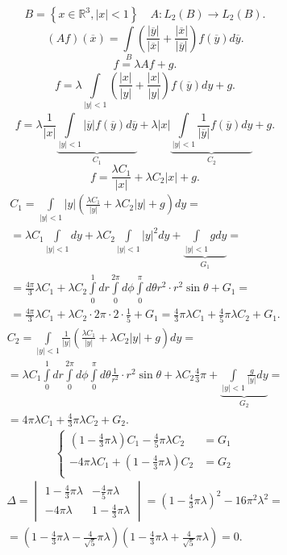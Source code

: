 \documentclass[a4paper]{article}
\begin{document}
\[
	B= \left\{ x \in \mathbb{R}^3, |x|<1 \right\} \quad
	A: L_2 (B) \to  L_2(B)
.\] 
\[
	(Af)\left( \overline{x} \right) = \int\limits_{B}^{} 
	\left( \frac{\left| \overline{y} \right| }{\left| \overline{x} \right| }+ \frac{\left| \overline{x} \right| }{\left| \overline{y} \right| } \right) f\left( \overline{y} \right) d \overline{y} 
.\] 
\[
f = \lambda A f +g
.\] 
\[
	f= \lambda \int\limits_{|y|<1}^{} \left( \frac{|x|}{|y|}+
	\frac{|x|}{|y|}\right) f\left( \overline{y} \right) dy+g 
.\] 
\[
	f = \lambda \frac{1}{|x|} \underbrace{\int\limits_{|y|<1}^{} \left| \overline{y} \right| f\left( \overline{y} \right) d \overline{y}}_{C_1}+
	\lambda |x| \underbrace{\int\limits_{|y|<1}^{} \frac{1}{\left| \overline{y} \right|}f\left( \overline{y} \right) dy}_{C_2} +g 
.\] 
\[
f= \frac{\lambda C_1}{|x|}+\lambda C_2 |x| +g
.\] 
\begin{multline*}
	C_1= \int\limits_{|y|<1}^{} |y| \left( \frac{\lambda
	C_1}{|y|}+\lambda C_2 |y| +g \right) dy=\\=
	\lambda C_1 \int\limits_{|y|<1}^{} dy + \lambda C_2
	\int\limits_{|y|<1}^{} |y|^2 dy + \underbrace{\int\limits_{|y|<1}^{} 
	g dy}_{G_1}=\\=\frac{4 \pi}{3} \lambda C_1 + \lambda C_2
	\int\limits_{0}^{1}  dr \int\limits_{0}^{2\pi} d\phi
	\int\limits_{0}^{\pi} d \theta r^2 \cdot r^2 \sin \theta+G_1=\\
	= \frac{4 \pi}{3} \lambda C_1 +\lambda C_2 \cdot 2 \pi
	\cdot 2 \cdot \frac{1}{5} +G_1= \frac{4}{3} \pi \lambda C_1+
	\frac{4}{5}\pi \lambda C_2+G_1
.\end{multline*} 
\begin{multline*}
	C_2 = \int\limits_{|y|<1}^{} \frac{1}{|y|} \left( 
	\frac{\lambda C_1}{|y|}+\lambda C_2 |y| +g\right) dy=\\=
	\lambda C_1 \int\limits_{0}^{1} dr \int\limits_{0}^{2\pi} d\phi
	\int\limits_{0}^{\pi} d\theta \frac{1}{r^2}\cdot r^2 \sin\theta+\lambda C_2 \frac{4}{3}
	\pi+ \underbrace{\int\limits_{|y|<1}^{} \frac{g}{|y|}dy}_{G_2}=\\= 4 \pi \lambda C_1 + \frac{4}{3}\pi \lambda C_2+ G_2 
.\end{multline*} 
\[
\left\{
\begin{aligned}
	\left( 1- \frac{4}{3}\pi \lambda \right) C_1 -
	\frac{4}{5} \pi \lambda C_2&=G_1\\
	-4 \pi \lambda C_1 + \left( 1- \frac{4}{3}\pi\lambda \right) C_2&= G_2 \\
\end{aligned}
\right.
\] 
\begin{multline*}
	\Delta = \begin{vmatrix} 1- \frac{4}{3}\pi \lambda &
	-\frac{4}{5}\pi \lambda \\ -4 \pi \lambda &
1- \frac{4}{3}\pi \lambda\end{vmatrix} =
\left( 1- \frac{4}{3} \pi \lambda \right) ^2 - 16 \pi^2 \lambda^2=\\=
\left( 1 - \frac{4}{3}\pi \lambda - \frac{4}{\sqrt{5}} \pi \lambda  \right) \left( 1- \frac{4}{3}\pi \lambda+  \frac{4}{\sqrt{5} }\pi\lambda \right) =0
.\end{multline*} 
\end{document}
